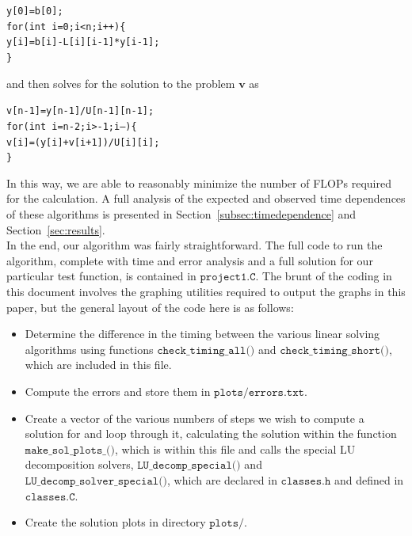 \documentclass[12pt]{article}
\numberwithin{equation}{section}
\begin{document}
\vspace{.4cm}
\begin{1stlisting}
\texttt{y[0]=b[0]; \\\indent for(int i=0;i<n;i++)\{ \\\indent\indent y[i]=b[i]-L[i][i-1]*y[i-1]; \\\indent\}}
\end{1stlisting}
\vspace{.4cm}

\noindent and then solves for the solution to the problem $\textbf{v}$ as

\vspace{.4cm}
\begin{1stlisting}
\texttt{v[n-1]=y[n-1]/U[n-1][n-1]; \\\indent for(int i=n-2;i>-1;i--)\{ \\\indent\indent v[i]=(y[i]+v[i+1])/U[i][i];\\\indent\}}
\end{1stlisting}
\vspace{.4cm}

\noindent In this way, we are able to reasonably minimize the number of FLOPs required for the calculation.  A full analysis of the expected and observed time dependences of these algorithms is presented in Section~\ref{subsec:timedependence} and Section~\ref{sec:results}.
\\\indent In the end, our algorithm was fairly straightforward.  The full code to run the algorithm, complete with time and error analysis and a full solution for our particular test function, is contained in $\texttt{project1.C}$.  The brunt of the coding in this document involves the graphing utilities required to output the graphs in this paper, but the general layout of the code here is as follows:

\begin{itemize}
\item Determine the difference in the timing between the various linear solving algorithms using functions $\texttt{check\_timing\_all()}$ and $\texttt{check\_timing\_short()}$, which are included in this file.
\item Compute the errors and store them in $\texttt{plots/errors.txt}$.
\item Create a vector of the various numbers of steps we wish to compute a solution for and loop through it, calculating the solution within the function $\texttt{make\_sol\_plots\_()}$, which is within this file and calls the special LU decomposition solvers, $\texttt{LU\_decomp\_special()}$ and $\texttt{LU\_decomp\_solver\_special()}$, which are declared in $\texttt{classes.h}$ and defined in $\texttt{classes.C}$.  
\item Create the solution plots in directory $\texttt{plots/}$.
\end{itemize}
\end{document}
